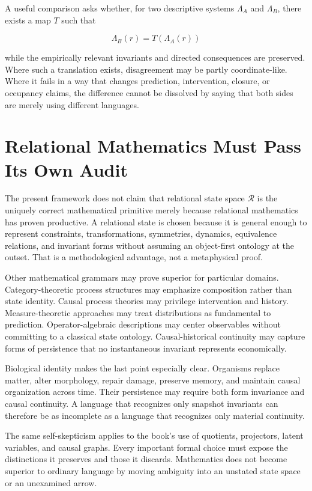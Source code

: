 A useful comparison asks whether, for two descriptive systems \(\Lambda_A\) and \(\Lambda_B\), there exists a map \(T\) such that

\[
\Lambda_B(r)=T(\Lambda_A(r))
\]

while the empirically relevant invariants and directed consequences are preserved. Where such a translation exists, disagreement may be partly coordinate-like. Where it fails in a way that changes prediction, intervention, closure, or occupancy claims, the difference cannot be dissolved by saying that both sides are merely using different languages.

\section{Relational Mathematics Must Pass Its Own Audit}

The present framework does not claim that relational state space \(\mathscr R\) is the uniquely correct mathematical primitive merely because relational mathematics has proven productive. A relational state is chosen because it is general enough to represent constraints, transformations, symmetries, dynamics, equivalence relations, and invariant forms without assuming an object-first ontology at the outset. That is a methodological advantage, not a metaphysical proof.

Other mathematical grammars may prove superior for particular domains. Category-theoretic process structures may emphasize composition rather than state identity. Causal process theories may privilege intervention and history. Measure-theoretic approaches may treat distributions as fundamental to prediction. Operator-algebraic descriptions may center observables without committing to a classical state ontology. Causal-historical continuity may capture forms of persistence that no instantaneous invariant represents economically.

Biological identity makes the last point especially clear. Organisms replace matter, alter morphology, repair damage, preserve memory, and maintain causal organization across time. Their persistence may require both form invariance and causal continuity. A language that recognizes only snapshot invariants can therefore be as incomplete as a language that recognizes only material continuity.

The same self-skepticism applies to the book's use of quotients, projectors, latent variables, and causal graphs. Every important formal choice must expose the distinctions it preserves and those it discards. Mathematics does not become superior to ordinary language by moving ambiguity into an unstated state space or an unexamined arrow.

